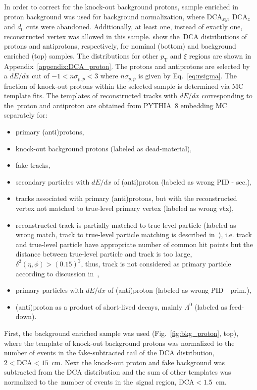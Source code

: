In order to correct for the knock-out background protons, sample enriched in proton background  was used for background normalization, where $\textrm{DCA}_{xy}$, $\textrm{DCA}_z$ and $d_0$ cuts were abandoned. Additionally, at least one, instead of exactly one,  reconstructed vertex was allowed in this sample.   show the~$\textrm{DCA}$ distributions of protons and antiprotons, respectively, for  nominal (bottom) and background enriched (top) samples. The distributions for other $p_\textrm{T}$ and $\xi$ regions are shown in Appendix~\ref{appendix:DCA_proton}.
The protons and antiprotons are selected by a $dE/dx$ cut of $-1 < n\sigma_{p,\bar{p}} < 3$ where $n\sigma_{p,\bar{p}}$ is given by Eq.~\eqref{eq:nsigma}. The fraction of knock-out protons within the selected sample is determined via \ac{MC} template fits. The templates of reconstructed tracks with $dE/dx$ corresponding to the~proton and antiproton are obtained from PYTHIA~8 embedding \ac{MC} separately for:
\begin{itemize}
	\item primary (anti)protons,
	\item knock-out background protons (labeled as dead-material),
	\item fake tracks,
	\item secondary particles with $dE/dx$ of (anti)proton (labeled as wrong PID - sec.),
	\item tracks associated with primary (anti)protons, but with the reconstructed vertex  not matched to true-level primary vertex (labeled as wrong vtx),
	\item reconstructed track is partially matched to true-level particle (labeled as wrong match, track to true-level particle matching is described in~\cite{supplementaryNote}), i.e.  track and true-level particle have appropriate number of common hit points but the distance between true-level particle and track is too large, $\delta^2\left(\eta,\phi\right)>\left(0.15\right)^2$, thus, track is not considered as primary particle according to discussion in~\cite{supplementaryNote}, 
	\item primary particles with $dE/dx$ of (anti)proton (labeled as wrong PID - prim.),
	\item (anti)proton as a product of short-lived decays, mainly $\Lambda^0$ (labeled as feed-down).
\end{itemize}



First, the background enriched sample was used  (Fig.~\ref{fig:bkg_proton}, top), where the template of knock-out background protons was normalized to the number of events in the fake-subtracted tail of the $\textrm{DCA}$ distribution, $2<\textrm{DCA}<15$~cm. Next the knock-out proton and fake background was subtracted from the $\textrm{DCA}$ distribution and the sum of other templates was normalized to the~number of events in the~signal region,  $\textrm{DCA}<1.5$~cm. 


